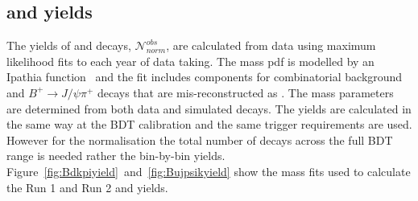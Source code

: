 {{%



\subsection{\bdkpi and \bujpsik yields}
The yields of \bujpsik and \bdkpi decays, $ \mathcal{N}^{obs}_{norm}$, are calculated from data using maximum likelihood fits to each year of data taking. 
The \bujpsik mass pdf is modelled by an Ipathia function~\cite{} and the fit includes components for combinatorial background and $B^{+} \to J/\psi \pi^{+}$ decays that are mis-reconstructed as \bujpsik. The mass \pdf parameters are determined from both data and simulated decays. The \bdkpi yields are calculated in the same way at the BDT calibration and the same trigger requirements are used. However for the normalisation the total number of \bdkpi decays across the full BDT range is needed rather the bin-by-bin yields. Figure~\ref{fig:Bdkpiyield}~and~\ref{fig:Bujpsikyield} show the mass fits used to calculate the Run 1 and Run 2 \bdkpi and \bujpsik yields.


}}
